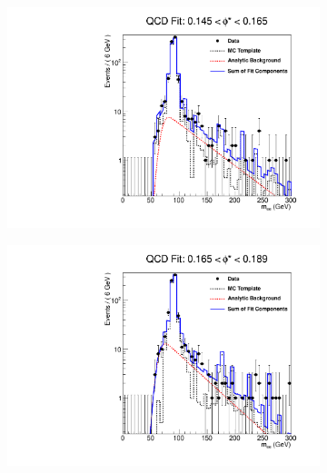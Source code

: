 \begin{figure}[!htbp]
    \centering
    \begin{subfigure}[b]{\SideBySidePlotWidth}
        \includegraphics[width=\linewidth]{figures/qcd_fits/qcd_fit_plot_for_21.pdf}
        \label{fig:qcd_fit_21}
    \end{subfigure}%
    \begin{subfigure}[b]{\SideBySidePlotWidth}
        \includegraphics[width=\linewidth]{figures/qcd_fits/qcd_fit_plot_for_22.pdf}
        \label{fig:qcd_fit_22}
    \end{subfigure}
    \begin{subfigure}[b]{\SideBySidePlotWidth}

\end{subfigure}
\end{figure}
